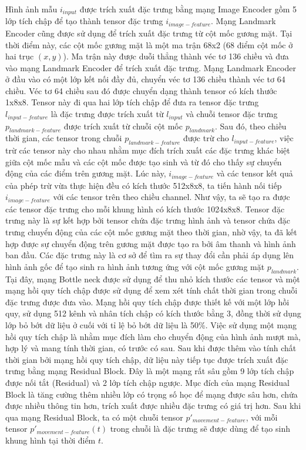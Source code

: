 Hình ảnh mẫu $i_{input}$ được trích xuất đặc trưng bằng mạng Image Encoder gồm 5 lớp tích chập để tạo thành tensor đặc trưng $i_{image-feature}$. Mạng Landmark Encoder cũng được sử dụng để trích xuất đặc trưng từ cột mốc gương mặt. Tại thời điểm này, các cột mốc gương mặt là một ma trận 68x2 (68 điểm cột mốc ở hai trục $(x,y)$). Ma trận này được duỗi thẳng thành véc tơ 136 chiều và đưa vào mạng Landmark Encoder để trích xuất đặc trưng. Mạng Landmark Encoder ở đầu vào có một lớp kết nối đầy đủ, chuyển véc tơ 136 chiều thành véc tơ 64 chiều. Véc tơ 64 chiều sau đó được chuyển dạng thành tensor có kích thước 1x8x8. Tensor này đi qua hai lớp tích chập để đưa ra tensor đặc trưng $l_{input-feature}$ là đặc trưng được trích xuất từ $l_{input}$ và chuỗi tensor đặc trưng $p_{landmark-feature}$ được trích xuất từ chuỗi cột mốc $p_{landmark}$. Sau đó, theo chiều thời gian, các tensor trong chuỗi $p_{landmark-feature}$ được trừ cho $l_{input-feature}$, việc trừ các tensor này cho nhau nhằm mục đích trích xuất các đặc trưng khác biệt giữa cột mốc mẫu và các cột mốc được tạo sinh và từ đó cho thấy sự chuyển động của các điểm trên gương mặt. Lúc này, $i_{image-feature}$ và các tensor kết quả của phép trừ vừa thực hiện đều có kích thước 512x8x8, ta tiến hành nối tiếp $i_{image-feature}$ với các tensor trên theo chiều channel. Như vậy, ta sẽ tạo ra được các tensor đặc trưng cho mỗi khung hình có kích thước 1024x8x8. Tensor đặc trưng này là sự kết hợp bởi tensor chứa đặc trưng hình ảnh và tensor chứa đặc trưng chuyển động của các cột mốc gương mặt theo thời gian, nhờ vậy, ta đã kết hợp được sự chuyển động trên gương mặt được tạo ra bởi âm thanh và hình ảnh ban đầu. Các đặc trưng này là cơ sở để tìm ra sự thay đổi cần phải áp dụng lên hình ảnh gốc để tạo sinh ra hình ảnh tương ứng với cột mốc gương mặt $p_{landmark}$. Tại đây, mạng Bottle neck được sử dụng để thu nhỏ kích thước các tensor và một mạng hồi quy tích chập được sử dụng để xem xét tính chất thời gian trong chuỗi đặc trưng được đưa vào. Mạng hồi quy tích chập được thiết kế với một lớp hồi quy, sử dụng 512 kênh và nhân tích chập có kích thước bằng 3, đồng thời sử dụng lớp bỏ bớt dữ liệu ở cuối với tỉ lệ bỏ bớt dữ liệu là 50\%. Việc sử dụng một mạng hồi quy tích chập là nhằm mục đích làm cho chuyển động của hình ảnh mượt mà, hợp lý và mang tính thời gian, có trước có sau. Sau khi được thêm vào tính chất thời gian bởi mạng hồi quy tích chập, dữ liệu này tiếp tục được trích xuất đặc trưng bằng mạng Residual Block. Đây là một mạng rất sâu gồm 9 lớp tích chập được nối tắt (Residual) và 2 lớp tích chập ngược. Mục đích của mạng Residual Block là tăng cường thêm nhiều lớp có trọng số học để mạng được sâu hơn, chứa được nhiều thông tin hơn, trích xuất được nhiều đặc trưng có giá trị hơn. Sau khi qua mạng Residual Block, ta có một chuỗi tensor $p'_{movement-feature}$, với mỗi tensor $p'_{movement-feature}(t)$ trong chuỗi là đặc trưng sẽ được dùng để tạo sinh khung hình tại thời điểm $t$.

